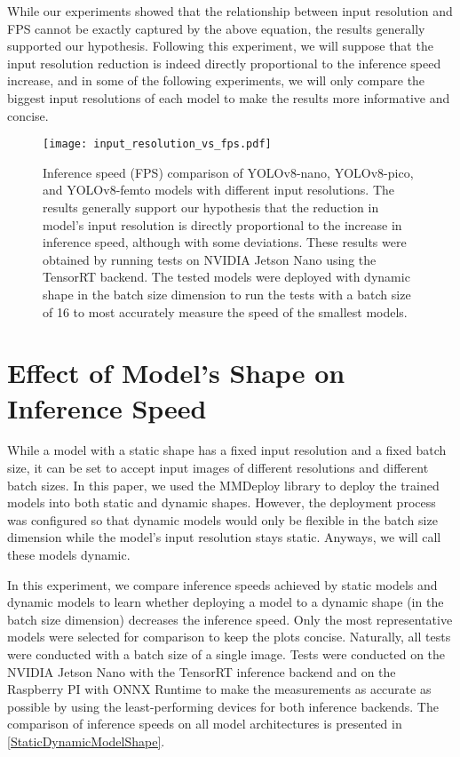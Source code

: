 While our experiments showed that the relationship between input resolution and FPS
cannot be exactly captured by the above equation, the results generally
supported our hypothesis. Following this experiment, we will suppose that the
input resolution reduction is indeed directly proportional to the inference speed
increase, and in some of the following experiments, we will only compare the
biggest input resolutions of each model to make the results more informative and
concise.

\begin{figure}[t]
    \begin{framed}
        \centering
        \texttt{[image: input\_resolution\_vs\_fps.pdf]}
        \caption{Inference speed (FPS) comparison of YOLOv8-nano, YOLOv8-pico, and
        YOLOv8-femto models with different input resolutions. The results generally
        support our hypothesis that the reduction in model's input resolution is directly
        proportional to the increase in inference speed, although with some
        deviations. These results were obtained by running tests on NVIDIA Jetson
        Nano using the TensorRT backend. The tested models were deployed with
        dynamic shape in the batch size dimension to run the tests with a batch size
        of 16 to most accurately measure the speed of the smallest models.}
        \label{InputResolutionVSFPS}
    \end{framed}
\end{figure}




\section{Effect of Model's Shape on Inference Speed}

While a model with a static shape has a fixed input resolution and a
fixed batch size, it can be set to accept input images of different resolutions
and different batch sizes. In this paper, we used the MMDeploy library to deploy
the trained models into both static and dynamic shapes. However, the deployment
process was configured so that dynamic models would only be flexible in the
batch size dimension while the model's input resolution stays static. Anyways, we
will call these models dynamic.

In this experiment, we compare inference speeds achieved by static models and
dynamic models to learn whether deploying a model to a dynamic shape (in the
batch size dimension) decreases the inference speed. Only the most
representative models were selected for comparison to keep the plots concise.
Naturally, all tests were conducted with a batch size of a single image. Tests
were conducted on the NVIDIA Jetson Nano with the TensorRT inference backend and
on the Raspberry PI with ONNX Runtime to make the measurements as accurate as
possible by using the least-performing devices for both inference backends. The
comparison of inference speeds on all model architectures is presented in
\autoref{StaticDynamicModelShape}.

